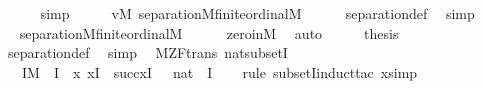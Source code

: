 \begin{isabellebody}
\ \ \ \ \isamarkupfalse%
\ simp\isanewline
\ \ \isamarkupfalse%
\ \isamarkupfalse%
\ {\isachardoublequoteopen}{\isacharparenleft}{\kern0pt}{\isasymforall}v{\isasymin}M{\isachardot}{\kern0pt}\ separation{\isacharparenleft}{\kern0pt}{\isacharhash}{\kern0pt}{\isacharhash}{\kern0pt}M{\isacharcomma}{\kern0pt}finite{\isacharunderscore}{\kern0pt}ordinal{\isacharparenleft}{\kern0pt}{\isacharhash}{\kern0pt}{\isacharhash}{\kern0pt}M{\isacharparenright}{\kern0pt}{\isacharparenright}{\kern0pt}{\isacharparenright}{\kern0pt}{\isachardoublequoteclose}\isanewline
\ \ \ \ \isamarkupfalse%
\ separation{\isacharunderscore}{\kern0pt}def\ \isamarkupfalse%
\ simp\isanewline
\ \ \isamarkupfalse%
\ \isamarkupfalse%
\ {\isachardoublequoteopen}separation{\isacharparenleft}{\kern0pt}{\isacharhash}{\kern0pt}{\isacharhash}{\kern0pt}M{\isacharcomma}{\kern0pt}finite{\isacharunderscore}{\kern0pt}ordinal{\isacharparenleft}{\kern0pt}{\isacharhash}{\kern0pt}{\isacharhash}{\kern0pt}M{\isacharparenright}{\kern0pt}{\isacharparenright}{\kern0pt}{\isachardoublequoteclose}\isanewline
\ \ \ \ \isamarkupfalse%
\ zero{\isacharunderscore}{\kern0pt}in{\isacharunderscore}{\kern0pt}M\ \isamarkupfalse%
\ auto\isanewline
\ \ \isamarkupfalse%
\ \isamarkupfalse%
\ {\isacharquery}{\kern0pt}thesis\ \isamarkupfalse%
\ separation{\isacharunderscore}{\kern0pt}def\ \isamarkupfalse%
\ simp\isanewline
{}\isamarkupfalse%
%
\endisatagproof
{\isafoldproof}%
%
\isadelimproof
\isanewline
%
\endisadelimproof
\isanewline
\isanewline
{}\isamarkupfalse%
\ {\isacharparenleft}{\kern0pt}\ M{\isacharunderscore}{\kern0pt}ZF{\isacharunderscore}{\kern0pt}trans{\isacharparenright}{\kern0pt}\ nat{\isacharunderscore}{\kern0pt}subset{\isacharunderscore}{\kern0pt}I{\isacharprime}{\kern0pt}\ {\isacharcolon}{\kern0pt}\isanewline
\ \ {\isachardoublequoteopen}{\isasymlbrakk}\ I{\isasymin}M\ {\isacharsemicolon}{\kern0pt}\ {}{\isasymin}I\ {\isacharsemicolon}{\kern0pt}\ {\isasymAnd}x{\isachardot}{\kern0pt}\ x{\isasymin}I\ {\isasymLongrightarrow}\ succ{\isacharparenleft}{\kern0pt}x{\isacharparenright}{\kern0pt}{\isasymin}I\ {\isasymrbrakk}\ {\isasymLongrightarrow}\ nat\ {\isasymsubseteq}\ I{\isachardoublequoteclose}\isanewline
%
\isadelimproof
\ \ %
\endisadelimproof
%
\isatagproof
{}\isamarkupfalse%
\ {\isacharparenleft}{\kern0pt}rule\ subsetI{\isacharcomma}{\kern0pt}induct{\isacharunderscore}{\kern0pt}tac\ x{\isacharcomma}{\kern0pt}simp{\isacharplus}{\kern0pt}{\isacharparenright}{\kern0pt}%

\end{isabellebody}
